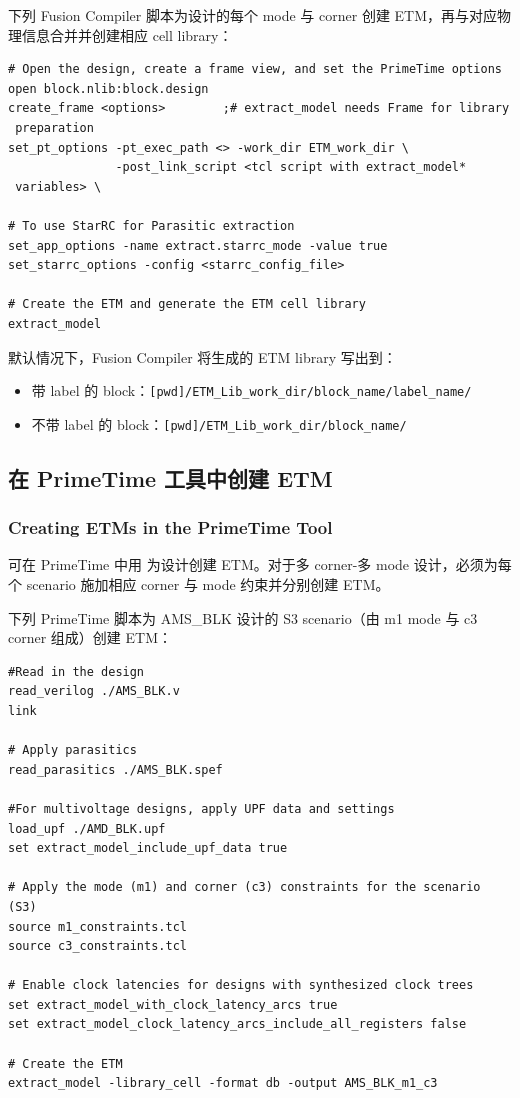 下列 Fusion Compiler 脚本为设计的每个 mode 与 corner 创建 ETM，再与对应物理信息合并并创建相应 cell library：
\begin{lstlisting}
# Open the design, create a frame view, and set the PrimeTime options
open block.nlib:block.design
create_frame <options>        ;# extract_model needs Frame for library
 preparation
set_pt_options -pt_exec_path <> -work_dir ETM_work_dir \
               -post_link_script <tcl script with extract_model*
 variables> \

# To use StarRC for Parasitic extraction
set_app_options -name extract.starrc_mode -value true
set_starrc_options -config <starrc_config_file>

# Create the ETM and generate the ETM cell library
extract_model
\end{lstlisting}

默认情况下，Fusion Compiler 将生成的 ETM library 写出到：
\begin{itemize}
  \item 带 label 的 block：\texttt{[pwd]/ETM\_Lib\_work\_dir/block\_name/label\_name/}
  \item 不带 label 的 block：\texttt{[pwd]/ETM\_Lib\_work\_dir/block\_name/}
\end{itemize}

\subsection{在 PrimeTime 工具中创建 ETM}
\subsubsection*{Creating ETMs in the PrimeTime Tool}

可在 PrimeTime 中用  为设计创建 ETM。对于多 corner-多 mode 设计，必须为每个 scenario 施加相应 corner 与 mode 约束并分别创建 ETM。

下列 PrimeTime 脚本为 AMS\_BLK 设计的 S3 scenario（由 m1 mode 与 c3 corner 组成）创建 ETM：
\begin{lstlisting}
#Read in the design
read_verilog ./AMS_BLK.v
link

# Apply parasitics
read_parasitics ./AMS_BLK.spef

#For multivoltage designs, apply UPF data and settings
load_upf ./AMD_BLK.upf
set extract_model_include_upf_data true

# Apply the mode (m1) and corner (c3) constraints for the scenario (S3)
source m1_constraints.tcl
source c3_constraints.tcl

# Enable clock latencies for designs with synthesized clock trees
set extract_model_with_clock_latency_arcs true
set extract_model_clock_latency_arcs_include_all_registers false

# Create the ETM
extract_model -library_cell -format db -output AMS_BLK_m1_c3
\end{lstlisting}

